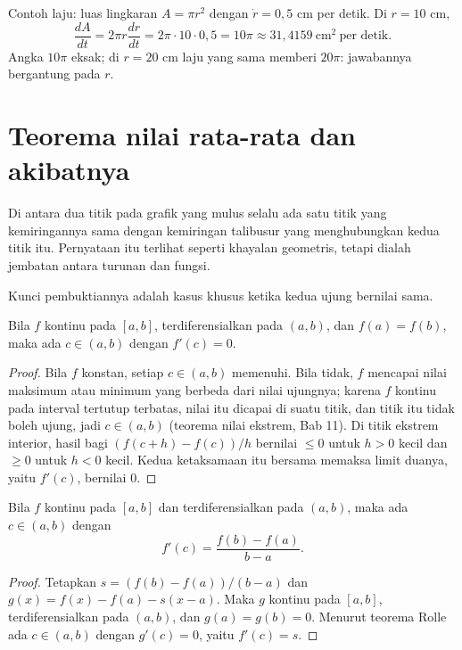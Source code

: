 Contoh laju: luas lingkaran $A=\pi r^{2}$ dengan $\dot r=0{,}5$ cm per detik. Di $r=10$ cm,
\[
  \frac{dA}{dt}=2\pi r\frac{dr}{dt}=2\pi\cdot10\cdot0{,}5=10\pi\approx31{,}4159
  \ \text{cm}^{2}\ \text{per detik}.
\]
Angka $10\pi$ eksak; di $r=20$ cm laju yang sama memberi $20\pi$: jawabannya bergantung
pada $r$.

\section{Teorema nilai rata-rata dan akibatnya}

Di antara dua titik pada grafik yang mulus selalu ada satu titik yang kemiringannya sama
dengan kemiringan talibusur yang menghubungkan kedua titik itu. Pernyataan itu terlihat
seperti khayalan geometris, tetapi dialah jembatan antara turunan dan fungsi.

Kunci pembuktiannya adalah kasus khusus ketika kedua ujung bernilai sama.

\begin{teorema}[Rolle]
Bila $f$ kontinu pada $[a,b]$, terdiferensialkan pada $(a,b)$, dan $f(a)=f(b)$, maka ada
$c\in(a,b)$ dengan $f'(c)=0$.
\end{teorema}

\begin{proof}
Bila $f$ konstan, setiap $c\in(a,b)$ memenuhi. Bila tidak, $f$ mencapai nilai maksimum atau
minimum yang berbeda dari nilai ujungnya; karena $f$ kontinu pada interval tertutup terbatas,
nilai itu dicapai di suatu titik, dan titik itu tidak boleh ujung, jadi $c\in(a,b)$ (teorema
nilai ekstrem, Bab 11). Di titik ekstrem interior, hasil bagi
$(f(c+h)-f(c))/h$ bernilai $\le0$ untuk $h>0$ kecil dan $\ge0$ untuk $h<0$ kecil. Kedua
ketaksamaan itu bersama memaksa limit duanya, yaitu $f'(c)$, bernilai $0$.
\end{proof}

\begin{teorema}
Bila $f$ kontinu pada $[a,b]$ dan terdiferensialkan pada $(a,b)$, maka ada $c\in(a,b)$
dengan
\[
  f'(c)=\frac{f(b)-f(a)}{b-a}.
\]
\end{teorema}

\begin{proof}
Tetapkan $s=(f(b)-f(a))/(b-a)$ dan $g(x)=f(x)-f(a)-s(x-a)$. Maka $g$ kontinu pada $[a,b]$,
terdiferensialkan pada $(a,b)$, dan $g(a)=g(b)=0$. Menurut teorema Rolle ada $c\in(a,b)$
dengan $g'(c)=0$, yaitu $f'(c)=s$.
\end{proof}

